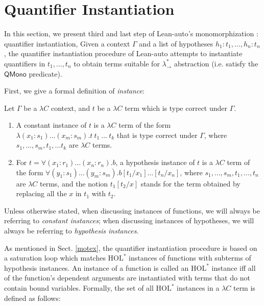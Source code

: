 \section{Quantifier Instantiation}\label{sectinst}
In this section, we present third and last step of Lean-auto's monomorphization : quantifier instantiation,
Given a context $\Gamma$ and a list of hypotheses $h_1 : t_1, \dots, h_n : t_n$, the quantifier
instantiation procedure of Lean-auto attempts to instantiate quantifiers in
$t_1, \dots, t_n$ to obtain terms suitable for $\lambda_\to^*$ abstraction (i.e. satisfy the $\mathsf{QMono}$ predicate).

First, we give a formal definition of \textit{instance}:

\begin{definition}
  Let $\Gamma$ be a $\lambda C$ context, and $t$ be a $\lambda C$ term which is type correct under $\Gamma$.
  \begin{enumerate}
    \item A constant instance of $t$ is a $\lambda C$ term of the
      form $\lambda (x_1 : s_1) \dots (x_m : s_m). t \ t_1 \ \dots \ t_k$ that is
      type correct under $\Gamma$, where $s_1, \dots, s_m, t_1, \dots t_k$ are $\lambda C$ terms.
    \item For $t = \forall (x_1 : r_1) \dots (x_n : r_n). b$, a hypothesis instance of
      $t$ is a $\lambda C$ term of the form $\forall (y_1 : s_1) \dots (y_m : s_m). b[t_1/x_1]\dots[t_n/x_n]$,
      where $s_1, \dots, s_m, t_1, \dots, t_n$ are $\lambda C$ terms, and the notion $t_1[t_2/x]$ stands
      for the term obtained by replacing all the $x$ in $t_1$ with $t_2$.
  \end{enumerate}
\end{definition}

Unless otherwise stated, when discussing instances of functions, we will always be
referring to \textit{constant instances}; when discussing instances of hypotheses, we will
always be referring to \textit{hypothesis instances}.

As mentioned in Sect. \ref{motex}, the quantifier instantiation procedure
is based on a saturation loop which matches $\text{HOL}^*$ instances of functions
with subterms of hypothesis instances. An instance of a function is called
an $\text{HOL}^*$ instance iff all of the function's dependent arguments are instantiated with terms
that do not contain bound variables. Formally, the set of all $\text{HOL}^*$ instances
in a $\lambda C$ term is defined as follows:

